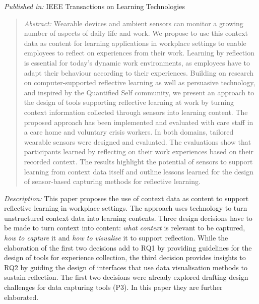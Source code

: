 \emph{Published in:} IEEE Transactions on Learning Technologies 
\begin{quote}
	\emph{Abstract:} Wearable devices and ambient sensors can monitor a growing number of aspects of daily life and work. We propose to use this context data as content for learning applications in workplace settings to enable employees to reflect on experiences from their work. Learning by reflection is essential for today's dynamic work environments, as employees have to adapt their behaviour according to their experiences. Building on research on computer-supported reflective learning as well as persuasive technology, and inspired by the Quantified Self community, we present an approach to the design of tools supporting reflective learning at work by turning context information collected through sensors into learning content. The proposed approach has been implemented and evaluated with care staff in a care home and voluntary crisis workers. In both domains, tailored wearable sensors were designed and evaluated. The evaluations show that participants learned by reflecting on their work experiences based on their recorded context. The results highlight the potential of sensors to support learning from context data itself and outline lessons learned for the design of sensor-based capturing methods for reflective learning. 
\end{quote}

\emph{Description:} This paper proposes the use of context data as content to support reflective learning in workplace settings. The approach uses technology to turn unstructured context data into learning contents. Three design decisions have to be made to turn context into content: \emph{what context} is relevant to be captured, \emph{how to capture} it and \emph{how to visualise} it to support reflection. While the elaboration of the first two decisions add to RQ1 by providing guidelines for the design of tools for experience collection, the third decision provides insights to RQ2 by guiding the design of interfaces that use data visualisation methods to sustain reflection. The first two decisions were already explored drafting design challenges for data capturing tools (P3). In this paper they are further elaborated.

